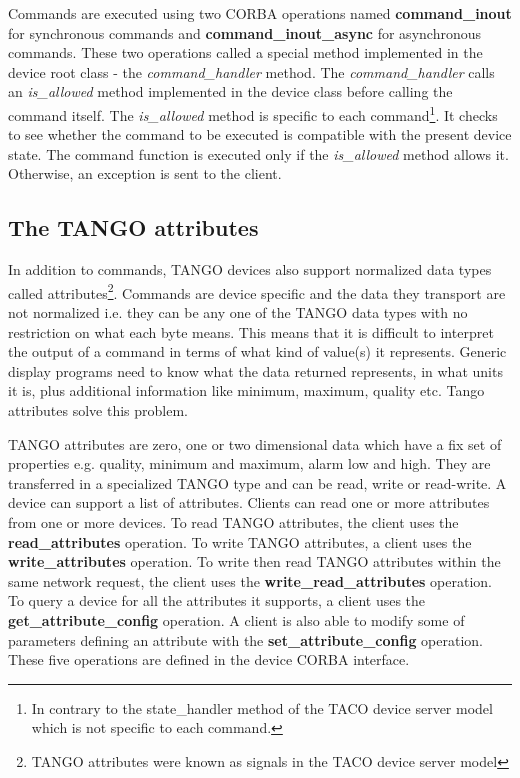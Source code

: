 Commands are executed using two CORBA operations named \textbf{command\_inout}
for synchronous commands and \textbf{command\_inout\_async}
for asynchronous commands. These two operations called a special method
implemented in the device root class - the \emph{command\_handler}
method. The \emph{command\_handler} calls an \emph{is\_allowed}
method implemented in the device class before calling the command
itself. The \emph{is\_allowed} method is specific to each command\footnote{In contrary to the state\_handler method of the TACO device server
model which is not specific to each command.}. It checks to see whether the command to be executed is compatible
with the present device state. The command function is executed only
if the \emph{is\_allowed} method allows it. Otherwise, an exception
is sent to the client.

\subsection{The TANGO attributes}

In addition to commands, TANGO devices also support normalized data
types called attributes\footnote{TANGO attributes were known as signals in the TACO device server model}.
Commands are device specific and the data they transport are not normalized
i.e. they can be any one of the TANGO data types with no restriction
on what each byte means. This means that it is difficult to interpret
the output of a command in terms of what kind of value(s)
it represents. Generic display programs need to know what the data
returned represents, in what units it is, plus additional information
like minimum, maximum, quality etc. Tango attributes solve this problem.

TANGO attributes are zero, one or two dimensional data which have
a fix set of properties e.g. quality, minimum and maximum, alarm low
and high. They are transferred in a specialized TANGO type and can
be read, write or read-write. A device can support a list of attributes.
Clients can read one or more attributes from one or more devices.
To read TANGO attributes, the client uses the \textbf{read\_attributes}
operation. To write TANGO attributes, a client uses the \textbf{write\_attributes}
operation. To write then read TANGO attributes within the same network
request, the client uses the \textbf{write\_read\_attributes}
operation. To query a device for all the attributes it supports, a
client uses the \textbf{get\_attribute\_config}
operation. A client is also able to modify some of parameters defining
an attribute with the \textbf{set\_attribute\_config}
operation. These five operations are defined in the device CORBA interface.

